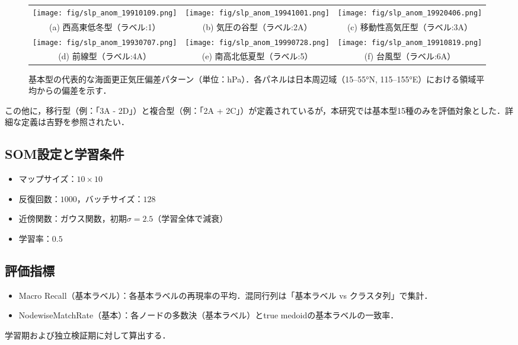 \documentclass{jarticle}
\theoremstyle{definition}
\begin{document}
\begin{figure*}[t!]
\centering
\begin{tabular}{ccc}
\texttt{[image: fig/slp\_anom\_19910109.png]} &
\texttt{[image: fig/slp\_anom\_19941001.png]} &
\texttt{[image: fig/slp\_anom\_19920406.png]} \\
(a) 西高東低冬型（ラベル:1） & (b) 気圧の谷型（ラベル:2A） & (c) 移動性高気圧型（ラベル:3A） \\
\texttt{[image: fig/slp\_anom\_19930707.png]} &
\texttt{[image: fig/slp\_anom\_19990728.png]} &
\texttt{[image: fig/slp\_anom\_19910819.png]} \\
(d) 前線型（ラベル:4A） & (e) 南高北低夏型（ラベル:5） & (f) 台風型（ラベル:6A） \\
\end{tabular}
\caption{基本型の代表的な海面更正気圧偏差パターン（単位：hPa）．各パネルは日本周辺域（15–55°N, 115–155°E）における領域平均からの偏差を示す．}
\label{fig:basic_patterns}
\end{figure*}

この他に，移行型（例：「3A - 2D」）と複合型（例：「2A + 2C」）が定義されているが，本研究では基本型15種のみを評価対象とした．詳細な定義は吉野\cite{吉野2002日本の気候}を参照されたい．

\subsection{SOM設定と学習条件}
\begin{itemize}
\item マップサイズ：$10\times 10$
\item 反復回数：$1000$，バッチサイズ：$128$
\item 近傍関数：ガウス関数，初期$\sigma=2.5$（学習全体で減衰）
\item 学習率：$0.5$
\end{itemize}

\subsection{評価指標}
\begin{itemize}
\item Macro Recall（基本ラベル）：各基本ラベルの再現率の平均．混同行列は「基本ラベル vs クラスタ列」で集計．
\item NodewiseMatchRate（基本）：各ノードの多数決（基本ラベル）とtrue medoidの基本ラベルの一致率．
\end{itemize}
学習期および独立検証期に対して算出する．
\end{document}
